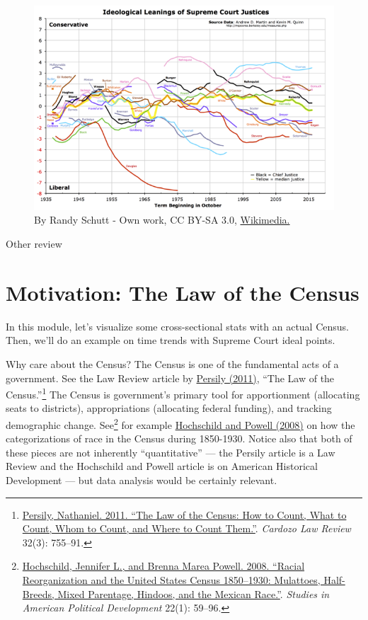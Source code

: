 \documentclass[]{book}
\let\rmarkdownfootnote\footnote%
\def\footnote{\protect\rmarkdownfootnote}
\theoremstyle{definition}
\theoremstyle{definition}
\theoremstyle{definition}
\theoremstyle{remark}
\begin{document}
\begin{figure}
\centering
\includegraphics{images/Martin-Quinn_Wikipedia.png}
\caption{By Randy Schutt - Own work, CC BY-SA 3.0,
\href{https://commons.wikimedia.org/w/index.php?curid=29585342}{Wikimedia.}}
\end{figure}

Other review

\section{Motivation: The Law of the
Census}\label{motivation-the-law-of-the-census}

In this module, let's visualize some cross-sectional stats with an
actual Census. Then, we'll do an example on time trends with Supreme
Court ideal points.

Why care about the Census? The Census is one of the fundamental acts of
a government. See the Law Review article by
\href{http://cardozolawreview.com/Joomla1.5/content/32-3/Persily.32-3.pdf}{Persily
(2011)}, ``The Law of the Census.''\footnote{\href{http://cardozolawreview.com/Joomla1.5/content/32-3/Persily.32-3.pdf}{Persily,
  Nathaniel. 2011. ``The Law of the Census: How to Count, What to Count,
  Whom to Count, and Where to Count Them.''}. \emph{Cardozo Law Review}
  32(3): 755--91.} The Census is government's primary tool for
apportionment (allocating seats to districts), appropriations
(allocating federal funding), and tracking demographic change.
See\footnote{\href{https://dash.harvard.edu/bitstream/handle/1/3153295/hoschschild_racialreorganization.pdf?sequence=2}{Hochschild,
  Jennifer L., and Brenna Marea Powell. 2008. ``Racial Reorganization
  and the United States Census 1850--1930: Mulattoes, Half-Breeds, Mixed
  Parentage, Hindoos, and the Mexican Race.''}. \emph{Studies in
  American Political Development} 22(1): 59--96.} for example
\href{https://dash.harvard.edu/bitstream/handle/1/3153295/hoschschild_racialreorganization.pdf?sequence=2}{Hochschild
and Powell (2008)} on how the categorizations of race in the Census
during 1850-1930. Notice also that both of these pieces are not
inherently ``quantitative'' --- the Persily article is a Law Review and
the Hochschild and Powell article is on American Historical Development
--- but data analysis would be certainly relevant.
\end{document}
